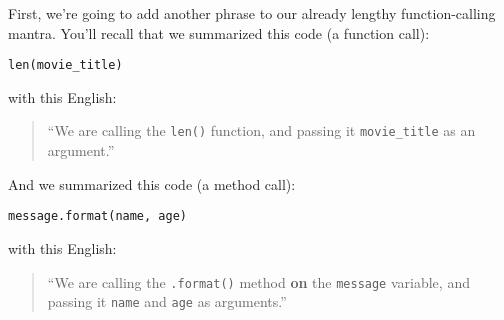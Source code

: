 First, we're going to add another phrase to our already lengthy
function-calling mantra. You'll recall that we summarized this code (a function
call):

\begin{Verbatim}[fontsize=\small,samepage=true,frame=single,framesep=3mm]
len(movie_title)
\end{Verbatim}

with this English:

\begin{quote}
``We are calling the \texttt{len()} function, and passing it
\texttt{movie\_title} as an argument.''
\end{quote}

And we summarized this code (a method call):

\begin{Verbatim}[fontsize=\small,samepage=true,frame=single,framesep=3mm]
message.format(name, age)
\end{Verbatim}

with this English:

\begin{quote}
``We are calling the \texttt{.format()} method \textbf{on} the \texttt{message}
variable, and passing it \texttt{name} and \texttt{age} as arguments.''
\end{quote}

